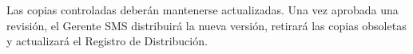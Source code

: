\vspace{0.3cm}

\begin{tcolorbox}[
colback=gray!5,
colframe=black,
title=Control de Distribución]

Las copias controladas deberán mantenerse actualizadas. Una vez aprobada una revisión, el Gerente SMS distribuirá la nueva versión, retirará las copias obsoletas y actualizará el Registro de Distribución.

\end{tcolorbox}